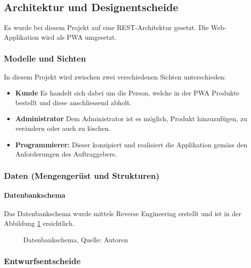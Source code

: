 \newpage
\subsection{Architektur und Designentscheide}
Es wurde bei diesem Projekt auf eine REST-Architektur gesetzt. Die Web-Applikation wird als \ac{PWA} umgesetzt. 
\subsubsection{Modelle und Sichten}
In diesem Projekt wird zwischen zwei verschiedenen Sichten unterschieden:
\begin{itemize}
    \item \textbf{Kunde} Es handelt sich dabei um die Person, welche in der \ac{PWA} Produkte bestellt und diese anschliessend abholt. 
    \item \textbf{Administrator} Dem Administrator ist es möglich, Produkt hinzuzufügen, zu verändern oder auch zu löschen. 
    \item \textbf{Programmierer: } Dieser konzipiert und realisiert die Applikation gemäss den Anforderungen des Auftraggebers.
\end{itemize}
\subsubsection{Daten (Mengengerüst und Strukturen)}
\paragraph{Datenbankschema}
Das Datenbankschema wurde mittels Reverse Engineering erstellt und ist in der Abbildung \ref{img: datebankschema} ersichtlich.
\begin{figure}[H]
    \centering
    \caption[Datenbankschema]{Datenbankschema, Quelle: Autoren}
    \label{img: datebankschema}
\end{figure}
\subsubsection{Entwurfsentscheide}
